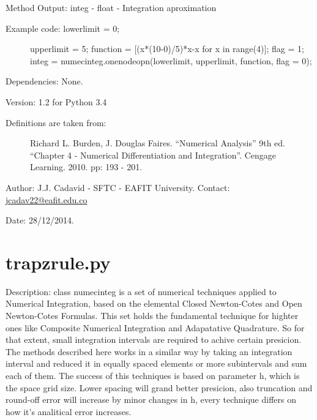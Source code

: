 \documentclass[letterpaper,10pt,oneside]{sphinxmanual}
\theoremstyle{plain}%
\theoremstyle{definition}%
\theoremstyle{remark}%
\begin{document}
Method Output: integ - float - Integration aproximation
\begin{description}
\item[{Example code: lowerlimit = 0;}] \leavevmode
upperlimit = 5;
function = {[}(x*(10-0)/5)*x-x for x in range(4){]};
flag = 1;
integ =                   numecinteg.onenodeopn(lowerlimit, upperlimit, function, flag = 0);

\end{description}

Dependencies: None.

Version: 1.2 for Python 3.4
\begin{description}
\item[{Definitions are taken from:}] \leavevmode
Richard L. Burden, J. Douglas Faires. ``Numerical Analysis'' 9th ed.
``Chapter 4 - Numerical Differentiation and Integration''. 
Cengage Learning. 2010. pp: 193 - 201.

\end{description}

Author: J.J. Cadavid - SFTC - EAFIT University.
Contact: \href{mailto:jcadav22@eafit.edu.co}{jcadav22@eafit.edu.co}

Date: 28/12/2014.


\section{trapzrule.py}
\label{code:trapzrule-py}\label{code:module-trapzrule}
Description: class numecinteg is a set of numerical techniques applied to
Numerical Integration, based on the elemental Closed Newton-Cotes and
Open Newton-Cotes Formulas. This set holds the fundamental technique for
highter ones like Composite Numerical Integration and Adapatative Quadrature.
So for that extent, small integration intervals are required to achive certain
presicion. The methods described here works in a similar way by taking an
integration interval and reduced it in equally spaced elements or more 
subintervals and sum each of them. The success of this techniques is based
on parameter h, which is the space grid size. Lower spacing will grand better
presicion, also truncation and round-off error will increase by minor changes
in h, every technique differs on how it's analitical error increases.
\end{document}
